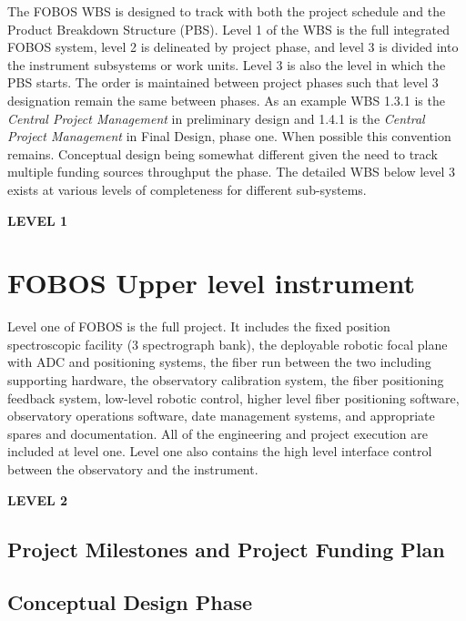 \documentclass[oneside,11pt]{amsart}
\begin{document}
The FOBOS WBS is designed to track with both the project schedule and
the Product Breakdown Structure (PBS). Level 1 of the WBS is the full
integrated FOBOS system, level 2 is delineated by project phase, and
level 3 is divided into the instrument subsystems or work units.
Level 3 is also the level in which the PBS starts. The order is
maintained between project phases such that level 3 designation
remain the same between phases. As an example WBS 1.3.1 is the {\it
Central Project Management} in preliminary design and 1.4.1 is the
{\it Central Project Management} in Final Design, phase one. When
possible this convention remains. Conceptual design being somewhat
different given the need to track multiple funding sources throughput
the phase. The detailed WBS below level 3 exists at various levels of
completeness for different sub-systems.

\bigskip

\begin{center}
{\bf \Large LEVEL 1}
\end{center}

\setcounter{section}{0}
\section{FOBOS Upper level instrument}

Level one of FOBOS is the full project. It includes the fixed
position spectroscopic facility (3 spectrograph bank), the deployable
robotic focal plane with ADC and positioning systems, the fiber run
between the two including supporting hardware, the observatory
calibration system, the fiber positioning feedback system, low-level
robotic control, higher level fiber positioning software, observatory
operations software, date management systems, and appropriate spares
and documentation. All of the engineering and project execution are
included at level one. Level one also contains the high level
interface control between the observatory and the instrument.

\bigskip

\begin{center}
{\bf \Large LEVEL 2}
\end{center}

\setcounter{section}{1}

\subsection{Project Milestones and Project Funding Plan}
\subsection{Conceptual Design Phase}
\end{document}
